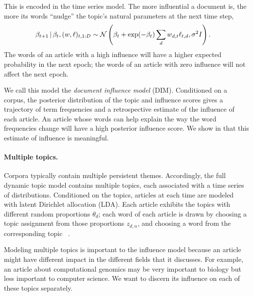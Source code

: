 This is encoded in the time series model.  The more influential a
document is, the more its words ``nudge'' the topic's natural
parameters at the next time step,
\begin{equation}
  \begin{split}
    \label{eq:logistic-normal-influence}
    \beta_{t+1} \, | \, & \beta_t, (w, \ell)_{t,1:D} \sim
    \mathcal{N}\left(
      \beta_{t} +
      \exp(-\beta_t) \sum_d w_{d,t} \ell_{t,d},
      \sigma^2 I
    \right).
  \end{split}
\end{equation}
The words of an article with a high influence will have a higher
expected probability in the next epoch; the words of an article
with zero influence will not affect the next epoch.


We call this model the \textit{document influence model}
(DIM). Conditioned on a corpus, the posterior distribution of the
topic and influence scores gives a trajectory of term frequencies and
a retrospective estimate of the influence of each article.  An article
whose words can help explain the way the word frequencies change will
have a high posterior influence score.  We show in 
that this estimate of influence is meaningful.

\paragraph{Multiple topics.}  Corpora typically contain multiple
persistent themes.  Accordingly, the full dynamic topic model contains
multiple topics, each associated with a time series of distributions.
Conditioned on the topics, articles at each time are modeled
with latent Dirichlet allocation (LDA).  Each article exhibits the
topics with different random proportions $\theta_d$; each word of each
article is drawn by choosing a topic assignment from those proportions
$z_{d,n}$, and choosing a word from the corresponding topic
~\cite{blei:2003}.

Modeling multiple topics is important to the influence model because
an article might have different impact in the different fields that it
discusses.  For example, an article about computational genomics may
be very important to biology but less important to computer science.
We want to discern its influence on each of these topics separately.

